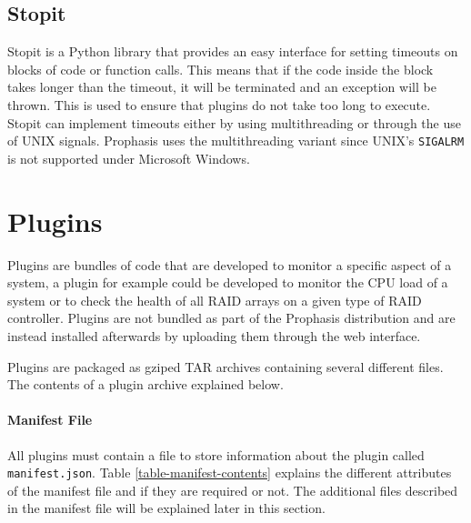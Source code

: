 \documentclass[bsc,deptreport,twoside,parskip,singlespacing,notimes]{infthesis}
\begin{document}
\subsection{Stopit}

	Stopit is a Python library that provides an easy interface for setting timeouts
	on blocks of code or function calls.  This means that if the code inside the
	block takes longer than the timeout, it will be terminated and an exception
	will be thrown.  This is used to ensure that plugins do not take too long to
	execute.  Stopit can implement timeouts either by using multithreading or
	through the use of UNIX signals.  Prophasis uses the multithreading variant
 	since UNIX's \texttt{SIGALRM} is not supported under Microsoft Windows.

\section{Plugins}
	Plugins are bundles of code that are developed to monitor a specific aspect of
	a system, a plugin for example could be developed to monitor the CPU load of a
	system or to check the health of all RAID arrays on a given type of RAID
	controller.  Plugins are not bundled as part of the Prophasis distribution and
	are instead installed afterwards by uploading them through the web interface.
	

	Plugins are packaged as gziped TAR archives containing several different files.
	The contents of a plugin archive explained below.

\paragraph*{Manifest File}
	All plugins must contain a file to store information about the plugin called
 	\texttt{manifest.json}. Table \ref{table-manifest-contents} explains the
 	different attributes of the manifest file and if they are required or not.
 	The additional files described in the manifest file will be explained later in
 	this section.
\end{document}
